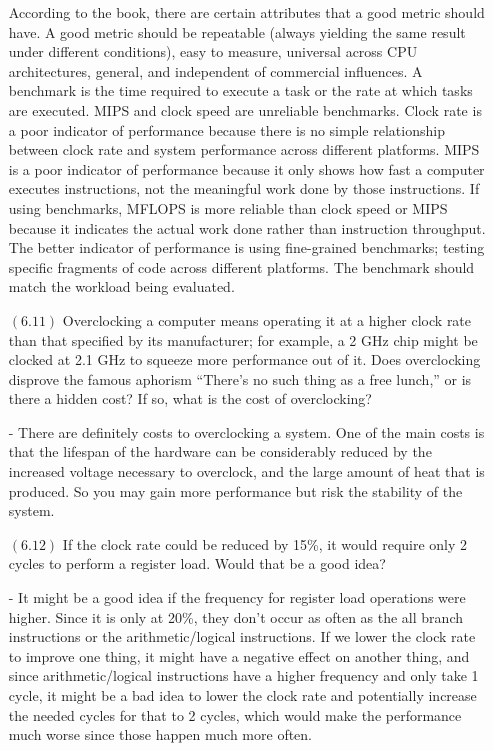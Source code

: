 \documentclass[letterpaper,10pt,titlepage]{article}
\begin{document}
\begin{enumerate}
According to the book, there are certain attributes that a good metric should have. A good metric should be repeatable (always yielding the same result under different conditions), easy to measure, universal across CPU architectures, general, and independent of commercial influences. A benchmark is the time required to execute a task or the rate at which tasks are executed. MIPS and clock speed are unreliable benchmarks. Clock rate is a poor indicator of performance because there is no simple relationship between clock rate and system performance across different platforms. MIPS is a poor indicator of performance because it only shows how fast a computer executes instructions, not the meaningful work done by those instructions. If using benchmarks, MFLOPS is more reliable than clock speed or MIPS because it indicates the actual work done rather than instruction throughput. The better indicator of performance is using fine-grained benchmarks; testing specific fragments of code across different platforms. The benchmark should match the workload being evaluated.


\item[$(6.11)$] Overclocking a computer means operating it at a higher clock rate than that specified by its manufacturer; for example, a 2 GHz chip might be clocked at 2.1 GHz to squeeze more performance out of it. Does overclocking disprove the famous aphorism “There’s no such thing as a free lunch,” or is there a hidden cost? If so, what is the cost of overclocking?

- There are definitely costs to overclocking a system. One of the main costs is that the lifespan of the hardware can be considerably reduced by the increased voltage necessary to overclock, and the large amount of heat that is produced. So you may gain more performance but risk the stability of the system.


\item[$(6.12)$] If the clock rate could be reduced by 15\%, it would require only 2 cycles to perform a register load. Would that be a good idea?

- It might be a good idea if the frequency for register load operations were higher. Since it is only at 20\%, they don’t occur as often as the all branch instructions or the arithmetic/logical instructions. If we lower the clock rate to improve one thing, it might have a negative effect on another thing, and since arithmetic/logical instructions have a higher frequency and only take 1 cycle, it might be a bad idea to lower the clock rate and potentially increase the needed cycles for that to 2 cycles, which would make the performance much worse since those happen much more often.



\end{enumerate}
\end{document}
